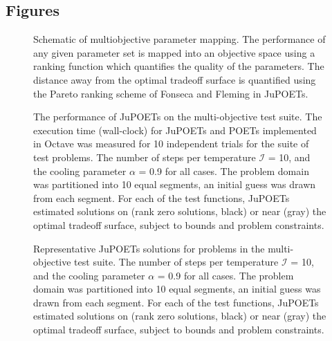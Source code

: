 \documentclass{bmcart}
\begin{document}
\begin{backmatter}



\clearpage

\section*{Figures}

\begin{figure}[h]
  \caption{Schematic of multiobjective parameter mapping. The performance of any given parameter set is mapped into an objective space using a ranking function which quantifies the quality of the parameters. The distance away from the optimal tradeoff surface is quantified using the Pareto ranking scheme of Fonseca and Fleming in JuPOETs.}\label{fig:fig-MOSAalgorithm}
\end{figure}

\begin{figure}[h]
  \caption{The performance of JuPOETs on the multi-objective test suite.
  The execution time (wall-clock) for JuPOETs and POETs implemented in Octave was measured for 10 independent trials for the suite of test problems.
  The number of steps per temperature $\mathcal{I}$ = 10, and the cooling parameter $\alpha$ = 0.9 for all cases.
  The problem domain was partitioned into 10 equal segments, an initial guess was drawn from each segment.
  For each of the test functions, JuPOETs estimated solutions on (rank zero solutions, black) or near (gray) the optimal tradeoff surface, subject to bounds and problem constraints.  }\label{fig:fig-timing}
\end{figure}

\begin{figure}[h]
  \caption{Representative JuPOETs solutions for problems in the multi-objective test suite.
  The number of steps per temperature $\mathcal{I}$ = 10, and the cooling parameter $\alpha$ = 0.9 for all cases.
  The problem domain was partitioned into 10 equal segments, an initial guess was drawn from each segment.
  For each of the test functions, JuPOETs estimated solutions on (rank zero solutions, black) or near (gray) the optimal tradeoff surface, subject to bounds and problem constraints.  }\label{fig:fig-surfaces}
\end{figure}


\end{backmatter}
\end{document}
